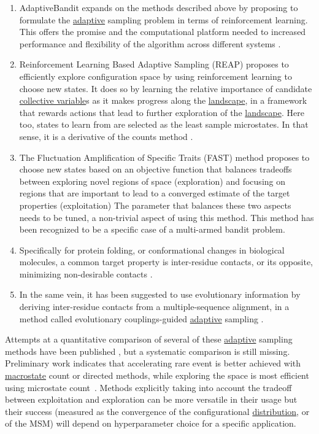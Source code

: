 \documentclass[9pt,review]{livecoms}
\begin{document}
    \begin{enumerate}
    \item AdaptiveBandit expands on the methods described above by proposing to formulate the \hyperlink{ref:Adaptive} {adaptive} sampling problem in terms of reinforcement learning. This offers the promise and the computational platform needed to increased performance and flexibility of the algorithm across different systems \cite{doi:10.1021/acs.jctc.0c00205}.
    \item Reinforcement Learning Based Adaptive Sampling (REAP) proposes to efficiently explore configuration space by using reinforcement learning to choose new states. It does so by learning the relative importance of candidate \hyperlink{ref:CV} {collective variable}s as it makes progress along the \hyperlink{ref:FES} {landscape}, in a framework that rewards actions that lead to further exploration of the \hyperlink{ref:FES} {landscape}. Here too, states to learn from are selected as the least sample microstates. In that sense, it is a derivative of the counts method \cite{doi:10.1021/acs.jpcb.8b06521}.
    \item The Fluctuation Amplification of Specific Traits (FAST) method proposes to choose new states based on an objective function that balances tradeoffs between exploring novel regions of space (exploration) and focusing on regions that are important to lead to a converged estimate of the target properties (exploitation) \cite{doi:10.1021/acs.jctc.5b00737,doi:10.1021/acs.jctc.8b00500} The parameter that balances these two aspects needs to be tuned, a non-trivial aspect of using this method. This method has been recognized to be a specific case of a multi-armed bandit problem.
    \item Specifically for protein folding, or conformational changes in biological molecules, a common target property is inter-residue contacts, or its opposite, minimizing non-desirable contacts \cite{doi:10.1063/1.5053582}.
    \item In the same vein, it has been suggested to use evolutionary information by deriving inter-residue contacts from a multiple-sequence alignment, in a method called evolutionary couplings-guided \hyperlink{ref:Adaptive} {adaptive} sampling \cite{shamsi_enhanced_2017}.
    \end{enumerate}


Attempts at a quantitative comparison of several of these \hyperlink{ref:Adaptive} {adaptive} sampling methods have been published \cite{doi:10.1063/1.5053582,doi:10.1021/acs.jctc.8b00500}, but a systematic comparison is still missing. Preliminary work indicates that accelerating rare event is better achieved with \hyperlink{ref:Macrostate} {macrostate} count or directed methods, while exploring the space is most efficient using microstate count~\cite{doi:10.1063/1.5053582}. Methods explicitly taking into account the tradeoff between exploitation and exploration can be more versatile in their usage but their success (measured as the convergence of the configurational \hyperlink{ref:Distribution} {distribution}, or of the MSM) will depend on hyperparameter choice for a specific application.
\end{document}
